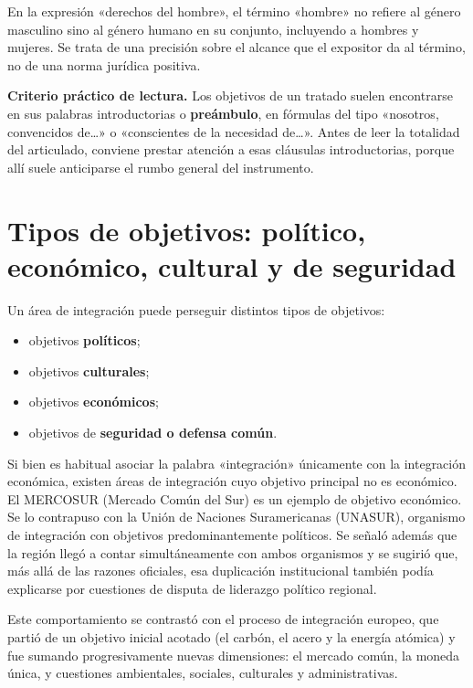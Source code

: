 \documentclass[12pt,oneside]{book}
\begin{document}
\begin{note}
En la expresión «derechos del hombre», el término «hombre» no refiere al género masculino sino al género humano en su conjunto, incluyendo a hombres y mujeres. Se trata de una precisión sobre el alcance que el expositor da al término, no de una norma jurídica positiva.
\end{note}

\textbf{Criterio práctico de lectura.} Los objetivos de un tratado suelen encontrarse en sus palabras introductorias o \textbf{preámbulo}, en fórmulas del tipo «nosotros, convencidos de…» o «conscientes de la necesidad de…». Antes de leer la totalidad del articulado, conviene prestar atención a esas cláusulas introductorias, porque allí suele anticiparse el rumbo general del instrumento.

\section{Tipos de objetivos: político, económico, cultural y de seguridad}

Un área de integración puede perseguir distintos tipos de objetivos:
\begin{itemize}
    \item objetivos \textbf{políticos};
    \item objetivos \textbf{culturales};
    \item objetivos \textbf{económicos};
    \item objetivos de \textbf{seguridad o defensa común}.
\end{itemize}

Si bien es habitual asociar la palabra «integración» únicamente con la integración económica, existen áreas de integración cuyo objetivo principal no es económico. El MERCOSUR (Mercado Común del Sur) es un ejemplo de objetivo económico. Se lo contrapuso con la Unión de Naciones Suramericanas (UNASUR), organismo de integración con objetivos predominantemente políticos. Se señaló además que la región llegó a contar simultáneamente con ambos organismos y se sugirió que, más allá de las razones oficiales, esa duplicación institucional también podía explicarse por cuestiones de disputa de liderazgo político regional.

Este comportamiento se contrastó con el proceso de integración europeo, que partió de un objetivo inicial acotado (el carbón, el acero y la energía atómica) y fue sumando progresivamente nuevas dimensiones: el mercado común, la moneda única, y cuestiones ambientales, sociales, culturales y administrativas.
\end{document}
